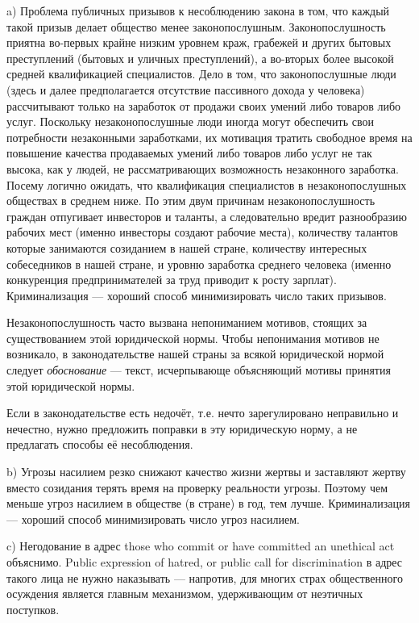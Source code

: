 \documentclass[11pt]{article}
\theoremstyle{remark}
\theoremstyle{definition}
\begin{document}
a) Проблема публичных призывов к несоблюдению закона в том, что каждый такой призыв делает общество менее законопослушным. Законопослушность приятна во-первых крайне низким уровнем краж, грабежей и других бытовых преступлений (бытовых и уличных преступлений), а во-вторых более высокой средней квалификацией специалистов. Дело в том, что законопослушные люди (здесь и далее предполагается отсутствие пассивного дохода у человека) рассчитывают только на заработок от продажи своих умений либо товаров либо услуг. Поскольку незаконопослушные люди иногда могут обеспечить свои потребности незаконными заработками, их мотивация тратить свободное время на повышение качества продаваемых умений либо товаров либо услуг не так высока, как у людей, не рассматривающих возможность незаконного заработка. Посему логично ожидать, что квалификация специалистов в незаконопослушных обществах в среднем ниже. По этим двум причинам незаконопослушность граждан отпугивает инвесторов и таланты, а следовательно вредит разнообразию рабочих мест (именно инвесторы создают рабочие места), количеству талантов которые занимаются созиданием в нашей стране, количеству интересных собеседников в нашей стране, и уровню заработка среднего человека (именно конкуренция предпринимателей за труд приводит к росту зарплат). Криминализация --- хороший способ минимизировать число таких призывов.

Незаконопослушность часто вызвана непониманием мотивов, стоящих за существованием этой юридической нормы. Чтобы непонимания мотивов не возникало, в законодательстве нашей страны за всякой юридической нормой следует \textit{обоснование} --- текст, исчерпывающе объясняющий мотивы принятия этой юридической нормы. 


Если в законодательстве есть недочёт, т.е. нечто зарегулировано неправильно и нечестно, нужно предложить поправки в эту юридическую норму, а не предлагать способы её несоблюдения. 






b) Угрозы насилием резко снижают качество жизни жертвы и заставляют жертву вместо созидания терять время на проверку реальности угрозы. Поэтому чем меньше угроз насилием в обществе (в стране) в год, тем лучше. Криминализация --- хороший способ минимизировать число угроз насилием.





c) Негодование в адрес those who commit or have committed an unethical act объяснимо. Public expression of hatred, or public call for discrimination в адрес такого лица не нужно наказывать --- напротив, для многих страх общественного осуждения является главным механизмом, удерживающим от неэтичных поступков. 
\end{document}
